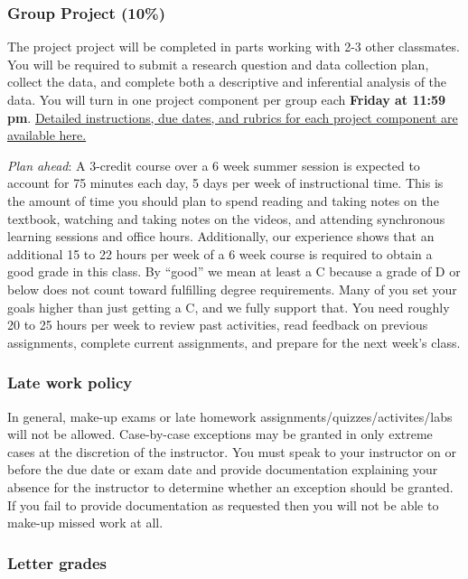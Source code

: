 \documentclass[
]{article}
\begin{document}
\subsubsection{Group Project (10\%)}\label{group-project-10}

The project project will be completed in parts working with 2-3 other
classmates. You will be required to submit a research question and data
collection plan, collect the data, and complete both a descriptive and
inferential analysis of the data. You will turn in one project component
per group each \textbf{Friday at 11:59 pm}.
\href{https://docs.google.com/document/d/1M-uz_NFvCF685WA9Gm4wZMDITWx1aRr5bYMWaMVGZNU/edit?usp=sharing}{Detailed
instructions, due dates, and rubrics for each project component are
available here.}

\emph{Plan ahead}: A 3-credit course over a 6 week summer session is
expected to account for 75 minutes each day, 5 days per week of
instructional time. This is the amount of time you should plan to spend
reading and taking notes on the textbook, watching and taking notes on
the videos, and attending synchronous learning sessions and office
hours. Additionally, our experience shows that an additional 15 to 22
hours per week of a 6 week course is required to obtain a good grade in
this class. By ``good'' we mean at least a C because a grade of D or
below does not count toward fulfilling degree requirements. Many of you
set your goals higher than just getting a C, and we fully support that.
You need roughly 20 to 25 hours per week to review past activities, read
feedback on previous assignments, complete current assignments, and
prepare for the next week's class.

\subsubsection{Late work policy}\label{late-work-policy}

In general, make-up exams or late homework
assignments/quizzes/activites/labs will not be allowed. Case-by-case
exceptions may be granted in only extreme cases at the discretion of the
instructor. You must speak to your instructor on or before the due date
or exam date and provide documentation explaining your absence for the
instructor to determine whether an exception should be granted. If you
fail to provide documentation as requested then you will not be able to
make-up missed work at all.

\subsubsection{Letter grades}\label{letter-grades}
\end{document}
